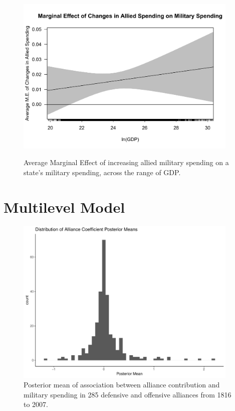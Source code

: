 \documentclass[12pt]{article}
\begin{document}
\begin{figure}
	\centering
		\includegraphics[width=0.95\textwidth]{abs-margins-plot.pdf}
	\label{fig:abs-margins-plot}
	\caption{Average Marginal Effect of increasing allied military spending on a state's military spending, across the range of GDP.}
\end{figure}


\section{Multilevel Model}


\begin{figure}[htbp]
	\centering
		\includegraphics[width=0.95\textwidth]{alliance-coefs-hist.pdf}
	\caption{Posterior mean of association between alliance contribution and military spending in 285 defensive and offensive alliances from 1816 to 2007.}
	\label{fig:alliance-coefs-hist}
\end{figure}
\end{document}
